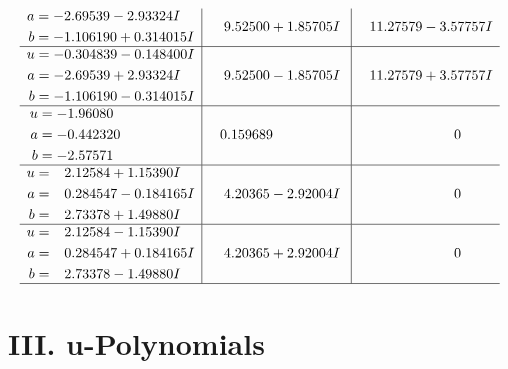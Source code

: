 \documentclass[1p]{elsarticle_modified}
\theoremstyle{definition}
\begin{document}
$$\begin{array}{c|c|c}
\begin{aligned}
a &= -2.69539 - 2.93324 I \\
b &= -1.106190 + 0.314015 I\end{aligned}
 & \phantom{-}9.52500 + 1.85705 I & \phantom{-}11.27579 - 3.57757 I \\ \hline\begin{aligned}
u &= -0.304839 - 0.148400 I \\
a &= -2.69539 + 2.93324 I \\
b &= -1.106190 - 0.314015 I\end{aligned}
 & \phantom{-}9.52500 - 1.85705 I & \phantom{-}11.27579 + 3.57757 I \\ \hline\begin{aligned}
u &= -1.96080\phantom{ +0.000000I} \\
a &= -0.442320\phantom{ +0.000000I} \\
b &= -2.57571\phantom{ +0.000000I}\end{aligned}
 & \phantom{-}0.159689\phantom{ +0.000000I} & \phantom{-0.000000 } 0 \\ \hline\begin{aligned}
u &= \phantom{-}2.12584 + 1.15390 I \\
a &= \phantom{-}0.284547 - 0.184165 I \\
b &= \phantom{-}2.73378 + 1.49880 I\end{aligned}
 & \phantom{-}4.20365 - 2.92004 I & \phantom{-0.000000 } 0 \\ \hline\begin{aligned}
u &= \phantom{-}2.12584 - 1.15390 I \\
a &= \phantom{-}0.284547 + 0.184165 I \\
b &= \phantom{-}2.73378 - 1.49880 I\end{aligned}
 & \phantom{-}4.20365 + 2.92004 I & \phantom{-0.000000 } 0\\
 \hline 
 \end{array}$$\newpage
\newpage\renewcommand{\arraystretch}{1}
\centering \section*{ III. u-Polynomials}
\end{document}
